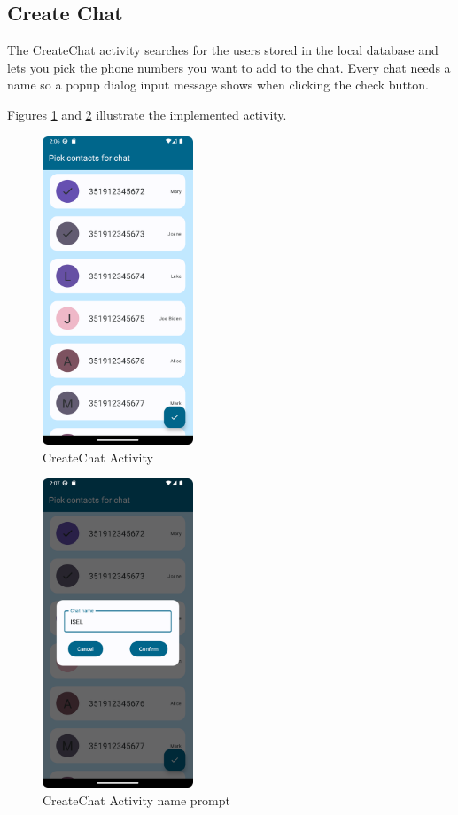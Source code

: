 \subsection{Create Chat}
The CreateChat activity searches for the users stored in the local database and lets you pick the phone numbers you want to add to the chat. Every chat needs a name so a popup dialog input message shows when clicking the check button.

Figures \ref{fig:CCA1} and \ref{fig:CCA2} illustrate the implemented activity.


\begin{figure}[!ht]
	\centering
	\includegraphics[trim={0cm -3cm 0 -3cm}, width=0.4\textwidth]{./Chapter6/Figures/CreateChatActivityPickContacts}
	\caption{CreateChat Activity}
	\label{fig:CCA1}
\end{figure}


\begin{figure}[!ht]
	\centering
	\includegraphics[trim={0cm -3cm 0 -3cm}, width=0.4\textwidth]{./Chapter6/Figures/CreateChatActivityName}
	\caption{CreateChat Activity name prompt}
	\label{fig:CCA2}
\end{figure}


